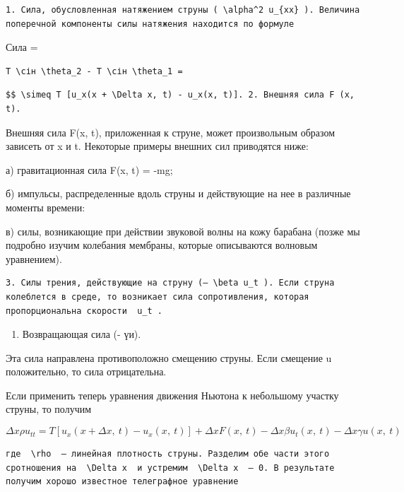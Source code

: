 \documentclass[
  ukrainian,
]{article}
\providecommand{\tightlist}{%
  \setlength{\itemsep}{0pt}\setlength{\parskip}{0pt}}
\begin{document}
\begin{verbatim}
1. Сила, обусловленная натяжением струны ( \alpha^2 u_{xx} ). Величина поперечной компоненты силы натяжения находится по формуле
\end{verbatim}

Сила =

\begin{verbatim}
Т \сін \theta_2 - Т \сін \theta_1 =
\end{verbatim}

\begin{verbatim}
$$ \simeq T [u_x(x + \Delta x, t) - u_x(x, t)]. 2. Внешняя сила F (x, t).
\end{verbatim}

Внешняя сила F(x, t), приложенная к струне, может произвольным образом
зависеть от x и t. Некоторые примеры внешних сил приводятся ниже:

а) гравитационная сила F(x, t) = -mg;

б) импульсы, распределенные вдоль струны и действующие на нее в
различные моменты времени:

в) силы, возникающие при действии звуковой волны на кожу барабана (позже
мы подробно изучим колебания мембраны, которые описываются волновым
уравнением).

\begin{verbatim}
3. Силы трения, действующие на струну (— \beta u_t ). Если струна колеблется в среде, то возникает сила сопротивления, которая пропорциональна скорости  u_t .
\end{verbatim}

\begin{enumerate}
\def\labelenumi{\arabic{enumi}.}
\setcounter{enumi}{3}
\tightlist
\item
  Возвращающая сила (- үи).
\end{enumerate}

Эта сила направлена противоположно смещению струны. Если смещение u
положительно, то сила отрицательна.

Если применить теперь уравнения движения Ньютона к небольшому участку
струны, то получим

\[
\Delta x \rho u_{tt} = T \left[ u_x \left( x + \Delta x, \ t \right) - u_x \left( x, \ t \right) \right] + \Delta x F \left( x, \ t \right) - \Delta x \beta u_t \left( x, \ t \right) - \Delta x \gamma u \left( x, \ t \right)
\]

\begin{verbatim}
где  \rho  — линейная плотность струны. Разделим обе части этого сротношения на  \Delta x  и устремим  \Delta x  — 0. В результате получим хорошо известное телеграфное уравнение
\end{verbatim}
\end{document}
